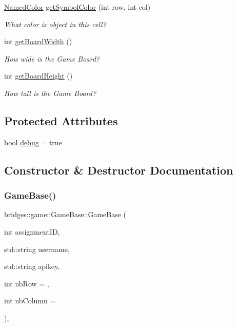 \begin{DoxyCompactItemize}
\hyperlink{namespacebridges_1_1game_afaa832a4322b25b6a4ebfba832f10f26}{Named\+Color} \hyperlink{classbridges_1_1game_1_1_game_base_a26c9f9547cc6f992a829ce5d6edd8f85}{get\+Symbol\+Color} (int row, int col)
\begin{DoxyCompactList}\small\item\em What color is object in this cell? \end{DoxyCompactList}\item 
int \hyperlink{classbridges_1_1game_1_1_game_base_ad74bf992cced25e9997fbf8a63bf8157}{get\+Board\+Width} ()
\begin{DoxyCompactList}\small\item\em How wide is the Game Board? \end{DoxyCompactList}\item 
int \hyperlink{classbridges_1_1game_1_1_game_base_a14510d6685e0b224c8995e397ad64adc}{get\+Board\+Height} ()
\begin{DoxyCompactList}\small\item\em How tall is the Game Board? \end{DoxyCompactList}\end{DoxyCompactItemize}
\subsection*{Protected Attributes}
\begin{DoxyCompactItemize}
\item 
bool \hyperlink{classbridges_1_1game_1_1_game_base_ad2af01edd927a31613d3b881286541bb}{debug} = true
\end{DoxyCompactItemize}


\subsection{Constructor \& Destructor Documentation}
\mbox{\label{classbridges_1_1game_1_1_game_base_abd73825c57a10d28191a3f1162eb9bd8}} 
\subsubsection{\texorpdfstring{Game\+Base()}{GameBase()}}
{\footnotesize\ttfamily bridges\+::game\+::\+Game\+Base\+::\+Game\+Base (\begin{DoxyParamCaption}\item[{int}]{assignment\+ID,  }\item[{std\+::string}]{username,  }\item[{std\+::string}]{apikey,  }\item[{int}]{nb\+Row = {},  }\item[{int}]{nb\+Column = {} }\end{DoxyParamCaption})\hspace{0.3cm}{\ttfamily [inline]}, {\ttfamily [protected]}}


